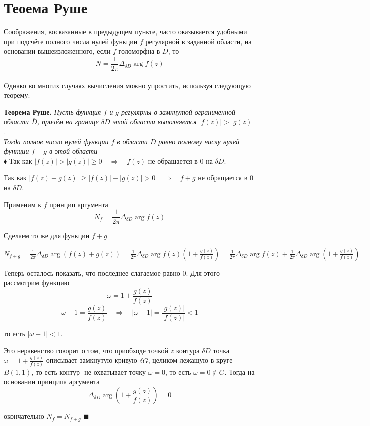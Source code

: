 \documentclass[a4paper, 12pt]{report}
\begin{document}
\section{Теоема Руше }
Соображения, восказанные в предыдущем пункте, часто оказывается удобными при подсчёте полного числа нулей функции \(f\) регулярной в заданной области, на основании вышеизложенного, если \(f\) голоморфна в \(\overline{D}\),  то $$N= \frac{1}{2\pi}  \Delta_{\delta D} \arg f(z)$$ 
\\ Oднако во многих случаях вычисления можно упростить, используя следующую теорему:
\par\bigskip
\textbf{Теорема Руше.}
\quad
\textit{Пусть функция \(f\)  и \(g\) регулярны в замкнутой ограниченной области \(\overline{D}\), причём на границе  \(\delta D \) этой области  выполняется \( |f(z)|>|g(z)|\). 
\\ Тогда полное число нулей функции \(f\) в области \(D\) равно полному числу нулей функции \(f+g\) в этой области}
\bigskip\\
$\blacklozenge$  \hspace{1 mm} Так как  \( |f(z)|>|g(z)| \geq 0 \quad \Rightarrow \quad f(z)\) не обращается в 0 на    \(\delta D \).
\par\bigskip Так как  \( |f(z) + g(z)| \geq |f(z)| - |g(z)| > 0 \quad \Rightarrow \quad f+g\) не обращается в 0 на    \(\delta D \).
\par\bigskip Применим к \(f\) принцип аргумента 
$$ N_f =  \frac{1}{2\pi}  \Delta_{\delta D} \arg f(z) $$
\par Сделаем то же для  функции \(f+g\)

\( N_{f+g} =  \frac{1}{2\pi}  \Delta_{\delta D} \arg (f(z) + g(z)) =  \frac{1}{2\pi}  \Delta_{\delta D} \arg f(z)(1 + \frac{g(z)}{f(z)} ) = \frac{1}{2\pi}  \Delta_{\delta D} \arg f(z) + \frac{1}{2\pi}  \Delta_{\delta D} \arg (1 + \frac{g(z)}{f(z)} ) = N_f + \frac{1}{2\pi}  \Delta_{\delta D} \arg (1 + \frac{g(z)}{f(z)} )\) 
\par\bigskip Теперь осталось показать, что последнее слагаемое равно 0. Для этого рассмотрим функцию $$\omega = 1 + \frac{g(z)}{f(z)} $$
$$\omega - 1 =  \frac{g(z)}{f(z)} \quad \Rightarrow \quad |\omega - 1 | =  \frac{|g(z)|}{|f(z)|} < 1$$
\par то есть \(|\omega - 1| < 1\).
\par\bigskip Это неравенство говорит о том, что приобходе точкой \(z\) контура  \(\delta D \) точка \(\omega = 1 + \frac{g(z)}{f(z)} \) описывает замкнутую кривую \(\delta G\), целиком лежащую в круге \(B(1,1)\), то есть контур \(\) не охватывает точку \(\omega = 0\), то есть  \(\omega = 0 \not\in G  \). Тогда на основании принципа аргумента $$\Delta_{\delta D} \arg (1 + \frac{g(z)}{f(z)})=0 $$\par\bigskip окончательно \(N_f = N_{f+g}\)  $\blacksquare $  
\end{document}
